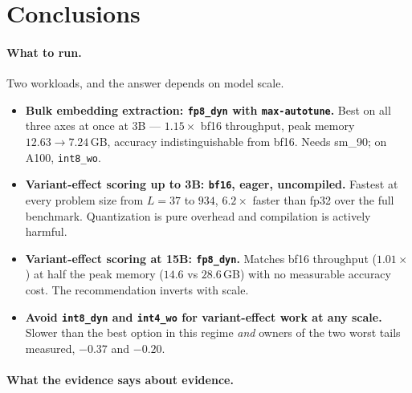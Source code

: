 \documentclass[11pt]{article}
\newcommand{\cfg}[1]{\texttt{#1}}
\begin{document}
\section{Conclusions}

\paragraph{What to run.} Two workloads, and the answer depends on model scale.

\begin{itemize}\setlength{\itemsep}{2pt}
  \item \textbf{Bulk embedding extraction: \cfg{fp8\_dyn} with
        \texttt{max-autotune}.} Best on all three axes at once at 3B ---
        $1.15\times$ bf16 throughput, peak memory $12.63 \to 7.24$\,GB, accuracy
        indistinguishable from bf16. Needs sm\_90; on A100, \cfg{int8\_wo}.
  \item \textbf{Variant-effect scoring up to 3B: \cfg{bf16}, eager,
        uncompiled.} Fastest at every problem size from $L=37$ to $934$,
        $6.2\times$ faster than fp32 over the full benchmark. Quantization is
        pure overhead and compilation is actively harmful.
  \item \textbf{Variant-effect scoring at 15B: \cfg{fp8\_dyn}.} Matches bf16
        throughput ($1.01\times$) at half the peak memory ($14.6$ vs $28.6$\,GB) with
        no measurable accuracy cost. The recommendation inverts with scale.
  \item \textbf{Avoid \cfg{int8\_dyn} and \cfg{int4\_wo} for variant-effect work
        at any scale.} Slower than the best option in this regime \emph{and}
        owners of the two worst tails measured, $-0.37$ and $-0.20$.
\end{itemize}

\paragraph{What the evidence says about evidence.}
\end{document}
